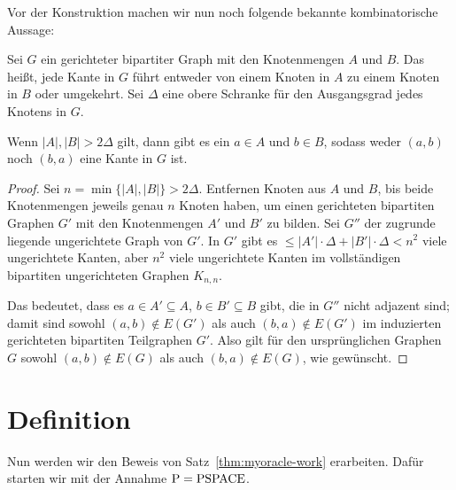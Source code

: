 Vor der Konstruktion machen wir nun noch folgende bekannte kombinatorische Aussage:
\begin{lemma}\label{lemma:bipartite}
    Sei $G$ ein gerichteter bipartiter Graph mit den Knotenmengen $A$ und $B$.
    Das heißt, jede Kante in $G$ führt entweder von einem Knoten in $A$ zu einem Knoten in $B$ oder umgekehrt.
    Sei $\Delta$ eine obere Schranke für den Ausgangsgrad jedes Knotens in $G$.

    Wenn $|A|,|B|>2\Delta$ gilt, dann gibt es ein $a\in A$ und $b\in B$, sodass weder $(a,b)$ noch $(b,a)$ eine Kante in $G$ ist.
\end{lemma}
\begin{proof}
    Sei $n=\min\{|A|,|B|\}>2\Delta$.
    Entfernen Knoten aus $A$ und $B$, bis beide Knotenmengen jeweils genau $n$ Knoten haben, um einen gerichteten bipartiten Graphen $G'$ mit den Knotenmengen $A'$ und $B'$ zu bilden.
    Sei $G''$ der zugrunde liegende ungerichtete Graph von $G'$.
    In $G'$ gibt es $\leq |A'|\cdot \Delta + |B'|\cdot\Delta<n^2$ viele ungerichtete Kanten,
    aber $n^2$ viele ungerichtete Kanten im vollständigen bipartiten ungerichteten Graphen $K_{n,n}$.

    Das bedeutet, dass es $a\in A'\subseteq A$, $b\in B'\subseteq B$ gibt, die in $G''$ nicht adjazent sind; damit sind sowohl $(a,b)\not\in E(G')$ als auch $(b,a)\not\in E(G')$ im induzierten gerichteten bipartiten Teilgraphen $G'$.
    Also gilt für den ursprünglichen Graphen $G$ sowohl $(a,b)\not\in E(G)$ als auch $(b,a)\not\in E(G)$, wie gewünscht.
\end{proof}

\section{Definition}\label{sec:oracle-definition}

Nun werden wir den Beweis von Satz~\ref{thm:myoracle-work} erarbeiten. Dafür starten wir mit der Annahme $\mathrm{P}=\mathrm{PSPACE}$.

